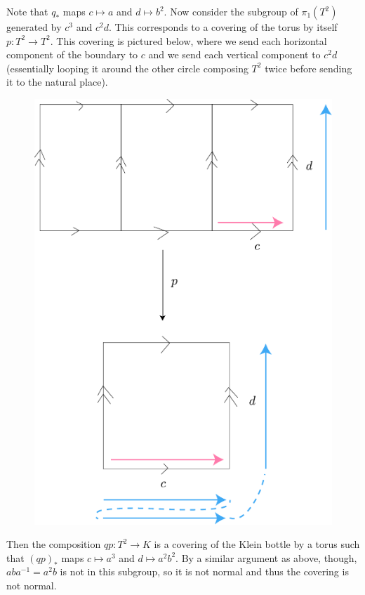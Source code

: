 \documentclass[twoside,10pt]{article}
\begin{document}
Note that $q_*$ maps $c \mapsto a$ and $d \mapsto b^2$. Now consider the subgroup of $\pi_1(T^{2})$ generated by $c^{3}$ and $c^{2}d$. This corresponds to a covering of the torus by itself $p:T^{2}\to T^{2}$. This covering is pictured below, where we send each horizontal component of the boundary to $c$ and we send each vertical component to $c^{2}d$ (essentially looping it around the other circle composing $T^{2}$ twice before sending it to the natural place).

\begin{figure}[H]
	\centering
	\includegraphics[scale=0.8]{fig/20c.pdf}
\end{figure}

Then the composition $qp:T^{2}\to K$ is a covering of the Klein bottle by a torus such that $(qp)_{*}$ maps $c \mapsto a^{3}$ and $d \mapsto a^{2} b^2$. By a similar argument as above, though, $a b a^{-1} = a^{2}b$ is not in this subgroup, so it is not normal and thus the covering is not normal.

\newpage
\end{document}
